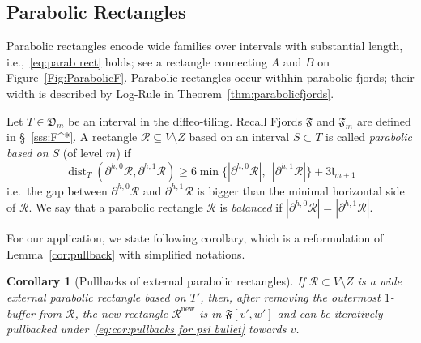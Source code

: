 \documentclass{amsart}
\renewcommand{\sp}{{\ \ }}
\newcommand{\1}{{\mathbb 1 }}
\newcommand{\reminder}[1]{\textsl{$\lhd\rhd$#1$\lhd\rhd$}\marginpar{$\lhd\rhd\lhd\rhd\lhd\rhd$}}
\newcommand\RR{\mathcal{R}}
\newcommand{\qq}{\mathfrak{q}}
\newcommand{\length}{{\mathfrak l}}
\newcommand\new{{\operatorname{new}}}
\newcommand{\Dbb}{{\mathfrak{D}}}
\newtheorem{cor}[thm]{Corollary}
\theoremstyle{remark}
\numberwithin{equation}{section}
\theoremstyle{definition}
\newcommand{\dist}{\operatorname{dist}}
\newcommand{\Fjord}{{\mathfrak F}}
\begin{document}
\subsection{Parabolic Rectangles}\label{ss:parabolicRectangle}

Parabolic rectangles encode wide families over intervals with substantial length, i.e.,~\eqref{eq:parab rect} holds; see a rectangle connecting $A$ and $B$ on Figure~\ref{Fig:ParabolicF}. Parabolic rectangles occur withhin parabolic fjords; their width is described by Log-Rule in Theorem~\ref{thm:parabolicfjords}.


Let $T\in \Dbb_m$ be an interval in the diffeo-tiling. Recall Fjords $\Fjord$ and $\Fjord_m$ are defined in \S~\ref{sss:F^*}. A rectangle $\RR \subseteq V \setminus Z$ based on an interval $S\subset T$ is called \emph{parabolic based on $S$} (of level $m$) if
\begin{equation}
\label{eq:parab rect}
\dist_{T}(\partial^{h,0}\RR,  \partial^{h,1}\RR ) \ge 6\min \{ | \partial^{h,0}\RR|,\sp | \partial^{h,1}\RR| \} +3\length_{m+1}
\end{equation}
i.e.~the gap between $ \partial^{h,0}\RR$ and $\partial^{h,1}\RR$ is bigger than the minimal horizontal side of $\RR.$ We say that a parabolic rectangle $\RR$ is \emph{balanced} if $|\partial^{h,0} \RR|=|\partial^{h,1} \RR|$. 

For our application, we state following corollary, which is a reformulation of Lemma~\ref{cor:pullback} with simplified notations. 
\begin{cor}[Pullbacks of external parabolic rectangles]\label{cor:pullbacks for psi bullet} If $\RR\subset V\setminus Z$ is a wide external parabolic rectangle based on $T'$, then, after removing the outermost $1$-buffer from $\RR$, the new rectangle $\RR^\new$ is in $\Fjord[v',w']$ and can be iteratively pullbacked under~\eqref{eq:cor:pullbacks for psi bullet} towards $v$.
\end{cor}

\end{document}
